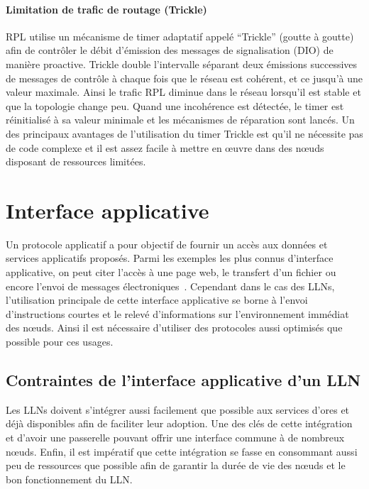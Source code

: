 \paragraph{Limitation de trafic de routage (Trickle)}

\ac{RPL} utilise un mécanisme de timer adaptatif appelé  ``Trickle'' (goutte à goutte) afin de contrôler le débit d’émission des messages de signalisation (\ac{DIO}) de manière proactive.
Trickle double l’intervalle séparant deux émissions successives de messages de contrôle à chaque fois que le réseau est cohérent, et ce jusqu’à une valeur maximale.
Ainsi le trafic \ac{RPL} diminue dans le réseau lorsqu'il est stable et que la topologie change peu.
Quand une incohérence est détectée, le timer est réinitialisé à sa valeur minimale et les mécanismes de réparation sont lancés.
Un des principaux avantages de l’utilisation du timer Trickle est qu’il ne nécessite pas de code complexe et il est assez facile à mettre en œuvre dans des nœuds disposant de ressources limitées.

\section{Interface applicative}
\label{gw:app_layer}

Un protocole applicatif a pour objectif de fournir un accès aux données et services applicatifs proposés.
Parmi les exemples les plus connus d'interface applicative, on peut citer l'accès à une page web, le transfert d'un fichier ou encore l'envoi de messages électroniques~\cite{pujolle2014reseaux}.
Cependant dans le cas des \ac{LLN}s, l'utilisation principale de cette interface applicative se borne à l'envoi d'instructions courtes et le relevé d'informations sur l'environnement immédiat des nœuds.
Ainsi il est nécessaire d'utiliser des protocoles aussi optimisés que possible pour ces usages.

\subsection{Contraintes de l'interface applicative d'un \ac{LLN}}

Les \ac{LLN}s doivent s'intégrer aussi facilement que possible aux services d'ores et déjà disponibles afin de faciliter leur adoption.
Une des clés de cette intégration et d'avoir une passerelle pouvant offrir une interface commune à de nombreux nœuds.
Enfin, il est impératif que cette intégration se fasse en consommant aussi peu de ressources que possible afin de garantir la durée de vie des nœuds et le bon fonctionnement du \ac{LLN}.

